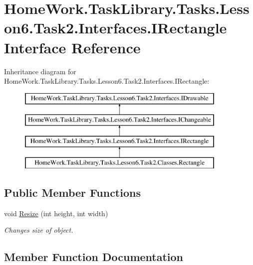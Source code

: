 \hypertarget{interface_home_work_1_1_task_library_1_1_tasks_1_1_lesson6_1_1_task2_1_1_interfaces_1_1_i_rectangle}{}\section{Home\+Work.\+Task\+Library.\+Tasks.\+Lesson6.\+Task2.\+Interfaces.\+I\+Rectangle Interface Reference}
\label{interface_home_work_1_1_task_library_1_1_tasks_1_1_lesson6_1_1_task2_1_1_interfaces_1_1_i_rectangle}
Inheritance diagram for Home\+Work.\+Task\+Library.\+Tasks.\+Lesson6.\+Task2.\+Interfaces.\+I\+Rectangle\+:\begin{figure}[H]
\begin{center}
\leavevmode
\includegraphics[height=4.000000cm]{interface_home_work_1_1_task_library_1_1_tasks_1_1_lesson6_1_1_task2_1_1_interfaces_1_1_i_rectangle}
\end{center}
\end{figure}
\subsection*{Public Member Functions}
\begin{DoxyCompactItemize}
\item 
void \mbox{\hyperlink{interface_home_work_1_1_task_library_1_1_tasks_1_1_lesson6_1_1_task2_1_1_interfaces_1_1_i_rectangle_a483c0de899c9d29069b8ab9434d7e060}{Resize}} (int height, int width)
\begin{DoxyCompactList}\small\item\em Changes size of object. \end{DoxyCompactList}\end{DoxyCompactItemize}


\subsection{Member Function Documentation}
\mbox{\label{interface_home_work_1_1_task_library_1_1_tasks_1_1_lesson6_1_1_task2_1_1_interfaces_1_1_i_rectangle_a483c0de899c9d29069b8ab9434d7e060}} 
